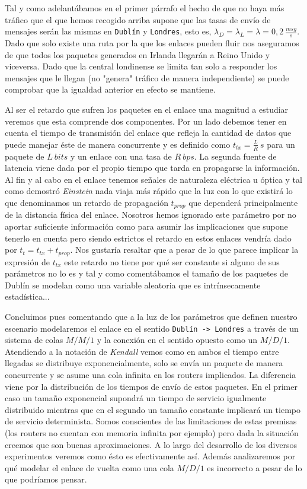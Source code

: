 \documentclass{article}[10pt]
\begin{document}
		Tal y como adelantábamos en el primer párrafo el hecho de que no haya más tráfico que el que hemos recogido arriba supone que las tasas de envío de mensajes serán las mismas en \texttt{Dublín} y \texttt{Londres}, esto es, $\lambda_D = \lambda_L = \lambda = 0,2\ \frac{msg}{s}$. Dado que solo existe una ruta por la que los enlaces pueden fluir nos aseguramos de que todos los paquetes generados en Irlanda llegarán a Reino Unido y viceversa. Dado que la central londinense se limita tan solo a responder los mensajes que le llegan (no "genera" tráfico de manera independiente) se puede comprobar que la igualdad anterior en efecto se mantiene.

		Al ser el retardo que sufren los paquetes en el enlace una magnitud a estudiar veremos que esta comprende dos componentes. Por un lado debemos tener en cuenta el tiempo de transmisión del enlace que refleja la cantidad de datos que puede manejar éste de manera concurrente y es definido como $t_{tx} = \frac{L}{R}\ s$ para un paquete de $L\ bits$ y un enlace con una tasa de $R\ bps$. La segunda fuente de latencia viene dada por el propio tiempo que tarda en propagarse la información. Al fin y al cabo en el enlace tenemos señales de naturaleza eléctrica u óptica y tal como demostró \textit{Einstein} nada viaja más rápido que la luz con lo que existirá lo que denominamos un retardo de propagación $t_{prop}$ que dependerá principalmente de la distancia física del enlace. Nosotros hemos ignorado este parámetro por no aportar suficiente información como para asumir las implicaciones que supone tenerlo en cuenta pero siendo estrictos el retardo en estos enlaces vendría dado por $t_t = t_{tx} + t_{prop}$. Nos gustaría resaltar que a pesar de lo que parece implicar la expresión de $t_{tx}$ este retardo no tiene por qué ser constante si alguno de sus parámetros no lo es y tal y como comentábamos el tamaño de los paquetes de Dublín se modelan como una variable aleatoria que es intrínsecamente estadística...

		Concluimos pues comentando que a la luz de los parámetros que definen nuestro escenario modelaremos el enlace en el sentido \texttt{Dublín -> Londres} a través de un sistema de colas $M/M/1$ y la conexión en el sentido opuesto como un $M/D/1$. Atendiendo a la notación de \textit{Kendall} vemos como en ambos el tiempo entre llegadas se distribuye exponencialmente, solo se envía un paquete de manera concurrente y se asume una cola infinita en los routers implicados. La diferencia viene por la distribución de los tiempos de envío de estos paquetes. En el primer caso un tamaño exponencial supondrá un tiempo de servicio igualmente distribuido mientras que en el segundo un tamaño constante implicará un tiempo de servicio determinista. Somos conscientes de las limitaciones de estas premisas (los routers no cuentan con memoria infinita por ejemplo) pero dada la situación creemos que son buenas aproximaciones. A lo largo del desarrollo de los diversos experimentos veremos como ésto es efectivamente así. Además analizaremos por qué modelar el enlace de vuelta como una cola $M/D/1$ es incorrecto a pesar de lo que podríamos pensar.
\end{document}
